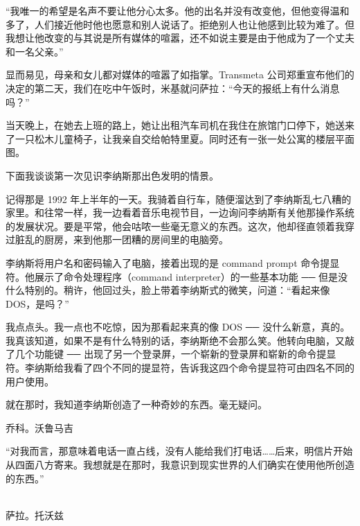 “我唯一的希望是名声不要让他分心太多。他的出名并没有改变他，但他变得温和多了，人们接近他时他也愿意和别人说话了。拒绝别人也让他感到比较为难了。但我想让他改变的与其说是所有媒体的喧嚣，还不如说主要是由于他成为了一个丈夫和一名父亲。”

显而易见，母亲和女儿都对媒体的喧嚣了如指掌。Transmeta 公司郑重宣布他们的决定的第二天，我们在吃中午饭时，米基就问萨拉：“今天的报纸上有什么消息吗？”

当天晚上，在她去上班的路上，她让出租汽车司机在我住在旅馆门口停下，她送来了一只松木儿童椅子，让我亲自交给帕特里夏。同时还有一张一处公寓的楼层平面图。

 

下面我谈谈第一次见识李纳斯那出色发明的情景。

记得那是 1992 年上半年的一天。我骑着自行车，随便溜达到了李纳斯乱七八糟的家里。和往常一样，我一边看着音乐电视节目，一边询问李纳斯有关他那操作系统的发展状况。要是平常，他会咕哝一些毫无意义的东西。这次，他却径直领着我穿过脏乱的厨房，来到他那一团糟的房间里的电脑旁。

李纳斯将用户名和密码输入了电脑，接着出现的是 command prompt 命令提显符。他展示了命令处理程序（command interpreter）的一些基本功能 ── 但是没什么特别的。稍许，他回过头，脸上带着李纳斯式的微笑，问道：“看起来像 DOS，是吗？”

我点点头。我一点也不吃惊，因为那看起来真的像 DOS ── 没什么新意，真的。我真该知道，如果不是有什么特别的话，李纳斯绝不会那么笑。他转向电脑，又敲了几个功能键 ── 出现了另一个登录屏，一个崭新的登录屏和崭新的命令提显符。李纳斯给我看了四个不同的提显符，告诉我这四个命令提显符可由四名不同的用户使用。

就在那时，我知道李纳斯创造了一种奇妙的东西。毫无疑问。

乔科。沃鲁马吉

 

“对我而言，那意味着电话一直占线，没有人能给我们打电话……后来，明信片开始从四面八方寄来。我想就是在那时，我意识到现实世界的人们确实在使用他所创造的东西。”

　　　　　　　　　　　　　　　　　　　　　　　　　　　　　　　　　　　　　萨拉。托沃兹

